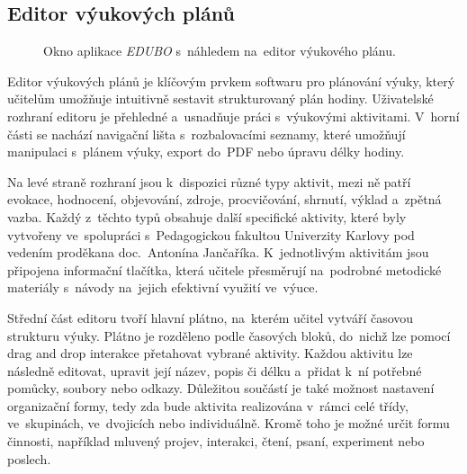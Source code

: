 \documentclass[male,czech,api_bc]{kitheses}
\begin{document}
\subsection{Editor výukových plánů}

\begin{figure}[H]
	\centering
	\caption{Okno aplikace \textit{EDUBO} s~náhledem na~editor výukového plánu.}
	\label{fig:edubo-1}
\end{figure}

Editor výukových plánů je klíčovým prvkem softwaru pro plánování výuky, který učitelům umožňuje intuitivně sestavit strukturovaný plán hodiny. Uživatelské rozhraní editoru je přehledné a~usnadňuje práci s~výukovými aktivitami. V~horní části se nachází navigační lišta s~rozbalovacími seznamy, které umožňují manipulaci s~plánem výuky, export do~PDF nebo úpravu délky hodiny.

Na levé straně rozhraní jsou k~dispozici různé typy aktivit, mezi ně patří evokace, hodnocení, objevování, zdroje, procvičování, shrnutí, výklad a~zpětná vazba. Každý z~těchto typů obsahuje další specifické aktivity, které byly vytvořeny ve~spolupráci s~Pedagogickou fakultou Univerzity Karlovy pod vedením proděkana doc.~Antonína Jančaříka. K~jednotlivým aktivitám jsou připojena informační tlačítka, která učitele přesměrují na~podrobné metodické materiály s~návody na~jejich efektivní využití ve~výuce.

Střední část editoru tvoří hlavní plátno, na~kterém učitel vytváří časovou strukturu výuky. Plátno je rozděleno podle časových bloků, do~nichž lze pomocí drag and drop interakce přetahovat vybrané aktivity. Každou aktivitu lze následně editovat, upravit její název, popis či délku a~přidat k~ní potřebné pomůcky, soubory nebo odkazy. Důležitou součástí je také možnost nastavení organizační formy, tedy zda bude aktivita realizována v~rámci celé třídy, ve~skupinách, ve~dvojicích nebo individuálně. Kromě toho je možné určit formu činnosti, například mluvený projev, interakci, čtení, psaní, experiment nebo poslech.
\end{document}
